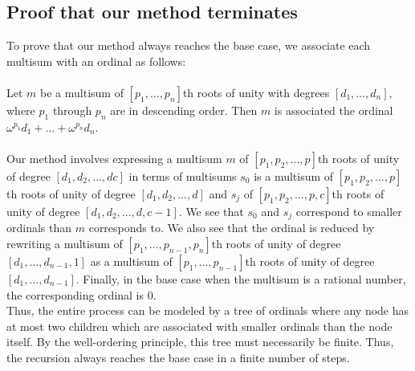 \documentclass{article}
\begin{document}
    \subsection{Proof that our method terminates}
        To prove that our method always reaches the base case, we associate each multisum with an ordinal as follows:\\
        \\
        Let $ m $ be a multisum of $ [p_1, \dots, p_n] $th roots of unity with degrees $ [d_1, \dots, d_n] $, where $ p_1 $ through $ p_n $ are in descending order. Then $ m $ is associated the ordinal $ \omega^{p_1} d_1 + \dots + \omega^{p_n} d_n $.\\
        \\
        Our method involves expressing a multisum $ m $ of $ [p_1, p_2, ..., p] $th roots of unity of degree $ [d_1, d_2, ..., dc] $ in terms of multisums $ s_0 $ is a multisum of $ [p_1, p_2, ..., p] $th roots of unity of degree $ [d_1, d_2, ..., d] $ and $ s_j $ of $ [p_1, p_2, ..., p, c] $th roots of unity of  degree $ [d_1, d_2, ..., d, c - 1] $. We see that $ s_0 $ and $ s_j $ correspond to smaller ordinals than $ m $ corresponds to. We also see that the ordinal is reduced by rewriting a multisum of $ [p_1, \dots, p_{n - 1}, p_n] $th roots of unity of degree $ [d_1, \dots, d_{n - 1}, 1] $ as a multisum of $ [p_1, \dots, p_{n - 1}] $th roots of unity of degree $ [d_1, \dots, d_{n - 1}] $. Finally, in the base case when the multisum is a rational number, the corresponding ordinal is $ 0 $.\\ Thus, the entire process can be modeled by a tree of ordinals where any node has at most two children which are associated with smaller ordinals than the node itself. By the well-ordering principle, this tree must necessarily be finite. Thus, the recursion always reaches the base case in a finite number of steps.\\
\end{document}
